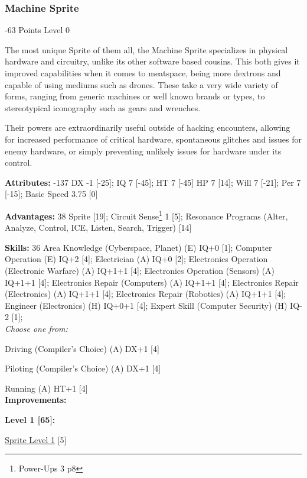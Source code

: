\begin{multicols*}{3}
\subsubsection{Machine Sprite}
\begin{flushright}
	-63 Points Level 0
\end{flushright}

The most unique Sprite of them all, the Machine Sprite specializes in physical hardware and circuitry, unlike its other software based cousins. This both gives it improved capabilities when it comes to meatspace, being more dextrous and capable of using mediums such as drones. These take a very wide variety of forms, ranging from generic machines or well known brands or types, to stereotypical iconography such as gears and wrenches.

Their powers are extraordinarily useful outside of hacking encounters, allowing for increased performance of critical hardware, spontaneous glitches and issues for enemy hardware, or simply preventing unlikely issues for hardware under its control.

\textbf{Attributes:} -137
DX -1 [-25]; IQ 7 [-45]; HT 7 [-45]
HP 7 [14]; Will 7 [-21]; Per 7 [-15]; Basic Speed 3.75 [0]

\textbf{Advantages:} 38
Sprite [19]; Circuit Sense\footnote{Power-Ups 3 p8} 1 [5]; Resonance Programs (Alter, Analyze, Control, ICE, Listen, Search, Trigger) [14]

\textbf{Skills:} 36
Area Knowledge (Cyberspace, Planet) (E) IQ+0 [1]; Computer Operation (E) IQ+2 [4]; Electrician (A) IQ+0 [2]; Electronics Operation (Electronic Warfare) (A) IQ+1+1 [4]; Electronics Operation (Sensors) (A) IQ+1+1 [4]; Electronics Repair (Computers) (A) IQ+1+1 [4]; Electronics Repair (Electronics) (A) IQ+1+1 [4];  Electronics Repair (Robotics) (A) IQ+1+1 [4];  Engineer (Electronics) (H) IQ+0+1 [4]; Expert Skill (Computer Security) (H) IQ-2 [1]; \\

\textit{Choose one from:}

Driving (Compiler's Choice) (A) DX+1 [4]

Piloting (Compiler's Choice) (A) DX+1 [4]

Running (A) HT+1 [4]\\

\textbf{ Improvements:}

\textbf{Level 1 [65]:}

\hyperref[sprite_level]{Sprite Level 1} [5]


\end{multicols*}
